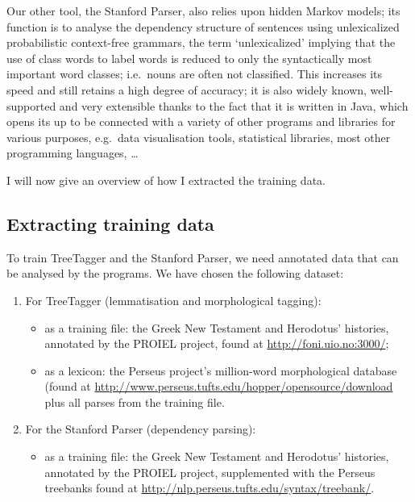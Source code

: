 Our other tool, the Stanford Parser, also relies upon hidden Markov models; its
function is to analyse the dependency structure of sentences using
unlexicalized probabilistic context-free grammars, the term `unlexicalized'
implying that the use of class words to label words is reduced to only the
syntactically most important word classes; i.e.\ nouns are often not
classified.  This increases its speed and still retains a high degree of
accuracy; it is also widely known, well-supported and very extensible thanks to
the fact that it is written in Java, which opens its up to be connected with a
variety of other programs and libraries for various purposes, e.g.\ data
visualisation tools, statistical libraries, most other programming languages,
\ldots

I will now give an overview of how I extracted the training data.

\subsection{Extracting training data} %
\label{sub:extract_training_data}
To train TreeTagger and the Stanford Parser, we need annotated data that can be analysed by the programs. We have chosen the following dataset:

\begin{enumerate}
  \item For TreeTagger (lemmatisation and morphological tagging):
\begin{itemize}
  \item as a training file: the Greek New Testament and Herodotus' histories, annotated by the PROIEL project, found at \url{http://foni.uio.no:3000/};
  \item as a lexicon: the Perseus project's million-word morphological database (found at \url{http://www.perseus.tufts.edu/hopper/opensource/download} plus all parses from the training file.
\end{itemize}

\item For the Stanford Parser (dependency parsing):
\begin{itemize}
  \item as a training file: the Greek New Testament and Herodotus' histories, annotated by the PROIEL project, supplemented with the Perseus treebanks found at \url{http://nlp.perseus.tufts.edu/syntax/treebank/}.
\end{itemize}
\end{enumerate}

